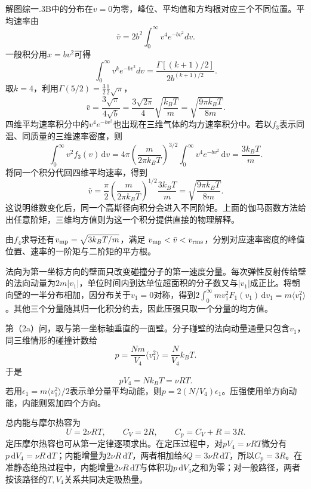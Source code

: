 \documentclass[UTF8,fontset=fandol,a4paper,11pt]{ctexart}
\begin{document}
解图综一.3B中的分布在$v=0$为零，峰位、平均值和方均根对应三个不同位置。平均速率由
\[
\bar v=2b^2\int_0^\infty v^4e^{-bv^2}dv.
\]
一般积分用$x=bv^2$可得
\[
\int_0^\infty v^k e^{-bv^2}dv
=\frac{\Gamma[(k+1)/2]}{2b^{(k+1)/2}}.
\]
取$k=4$，利用$\Gamma(5/2)=\frac32\frac12\sqrt\pi$，
\[
\boxed{\bar v=\frac{3\sqrt\pi}{4\sqrt b}
=\frac{3\sqrt{2\pi}}4\sqrt{\frac{k_BT}{m}}
=\sqrt{\frac{9\pi k_BT}{8m}}}.
\]
四维平均速率积分中的$v^4e^{-bv^2}$也出现在三维气体的均方速率积分中。若以$f_3$表示同温、同质量的三维速率密度，则
\[
\int_0^\infty v^2f_3(v)\,\mathrm dv
=4\pi\left(\frac{m}{2\pi k_BT}\right)^{3/2}
\int_0^\infty v^4e^{-bv^2}\,\mathrm dv=\frac{3k_BT}{m}.
\]
将同一个积分代回四维平均速率，得到
\[
\bar v=\frac\pi2\left(\frac{m}{2\pi k_BT}\right)^{1/2}
\frac{3k_BT}{m}=\sqrt{\frac{9\pi k_BT}{8m}}.
\]
这说明维数变化后，同一个高斯径向积分会进入不同阶矩。上面的伽马函数方法给出任意阶矩，三维均方值则为这一个积分提供直接的物理解释。

由$f_4$求导还有$v_{\rm mp}=\sqrt{3k_BT/m}$，满足
$v_{\rm mp}<\bar v<v_{\rm rms}$，分别对应速率密度的峰值位置、速率的一阶矩与二阶矩的平方根。

法向为第一坐标方向的壁面只改变碰撞分子的第一速度分量。每次弹性反射传给壁的法向动量为$2m|v_1|$，单位时间内到达单位超面积的分子数又与$|v_1|$成正比。将朝向壁的一半分布相加，因分布关于$v_1=0$对称，得到$2\int_0^\infty mv_1^2F_1(v_1)\,\mathrm dv_1=m\langle v_1^2\rangle$。其他三个分量随其归一化积分约去，因此压强只取一个分量的均方值。

第（2a）问，取与第一坐标轴垂直的一面壁。分子碰壁的法向动量通量只包含$v_1$，同三维情形的碰撞计数给
\[
p=\frac{Nm}{V_4}\langle v_1^2\rangle
=\frac{N}{V_4}k_BT.
\]
于是
\[
\boxed{pV_4=Nk_BT=\nu RT}.
\]
若用$\epsilon_1=m\langle v_1^2\rangle/2$表示单分量平均动能，则$p=2(N/V_4)\epsilon_1$。压强使用单方向动能，内能则累加四个方向。

总内能与摩尔热容为
\[
U=2\nu RT,\qquad C_V=2R,\qquad C_p=C_V+R=3R.
\]
定压摩尔热容也可从第一定律逐项求出。在定压过程中，对$pV_4=\nu RT$微分有$p\,\mathrm dV_4=\nu R\,\mathrm dT$；内能增量为$2\nu R\,\mathrm dT$，两者相加给$\delta Q=3\nu R\,\mathrm dT$，所以$C_p=3R$。在准静态绝热过程中，内能增量$2\nu R\,\mathrm dT$与体积功$p\,\mathrm dV_4$之和为零；对一般路径，两者按该路径的$T,V_4$关系共同决定吸热量。
\end{document}
